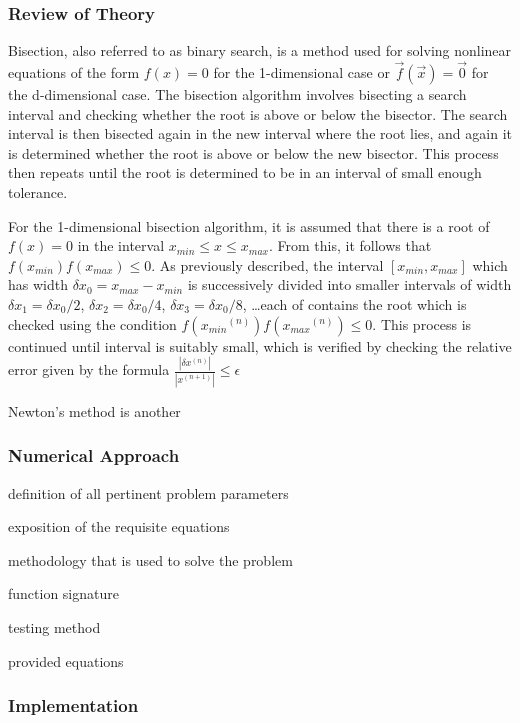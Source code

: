 \documentclass[10pt]{article}
\begin{document}
\subsubsection*{Review of Theory}

Bisection, also referred to as binary search, is a method used for solving nonlinear equations of the 
form $f(x)=0$ for the 1-dimensional case or $\vec{f}(\vec{x})=\vec{0}$ for the d-dimensional case. The
bisection algorithm involves bisecting a search interval and checking whether the root is above or 
below the bisector. The search interval is then bisected again in the new interval where the root lies, 
and again it is determined whether the root is above or below the new bisector. This process then repeats
until the root is determined to be in an interval of small enough tolerance. 

For the 1-dimensional bisection algorithm, it is assumed that there is a root of $f(x)=0$ in the interval
$x_{min} \leq x \leq x_{max}$. From this, it follows that $f(x_{min})f(x_{max}) \leq 0$. As previously 
described, the interval $[x_{min}, x_{max}]$ which has width $\delta x_0 = x_{max} - x_{min}$ is
successively divided into smaller intervals of width $\delta x_1 = \delta x_0/2$, 
$\delta x_2 = \delta x_0/4$, $\delta x_3 = \delta x_0/8$, \ldots each of contains the root which is 
checked using the condition $f({x_{min}}^{(n)})f({x_{max}}^{(n)}) \leq 0$. This process is continued until 
interval is suitably small, which is verified by checking the relative error given by the formula
$\frac{| \delta x^{(n)} |}{| x^{(n+1)} |} \leq \epsilon$

Newton's method is another 

\subsubsection*{Numerical Approach}

definition of all pertinent problem parameters

exposition of the requisite equations

methodology that is used to solve the problem

function signature 

testing method 

provided equations

\subsubsection*{Implementation}
\end{document}
